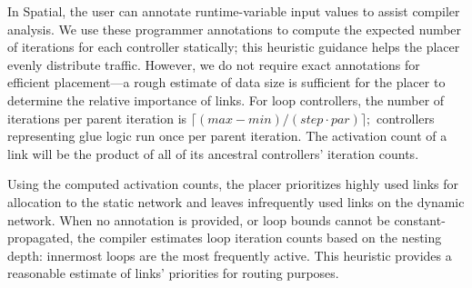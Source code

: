 In Spatial, the user can annotate runtime-variable input values to assist compiler analysis.  
We use these programmer annotations to compute the expected number of iterations for each controller statically; this heuristic guidance helps the placer evenly distribute traffic. 
However, we do not require exact annotations for efficient placement---a rough estimate of data size is sufficient for the placer to determine the relative importance of links.
For loop controllers, the number of iterations per parent iteration is $\lceil(max-min)/(step\cdot par)\rceil;$ controllers representing glue logic run once per parent iteration.
The activation count of a link will be the product of all of its ancestral controllers' iteration counts.


Using the computed activation counts, the placer prioritizes highly used links for allocation to the static network and leaves infrequently used links on the dynamic network. 
When no annotation is provided, or loop bounds cannot be constant-propagated, the compiler estimates loop iteration counts based on the nesting depth: innermost loops are the most frequently active.
This heuristic provides a reasonable estimate of links' priorities for routing purposes.
